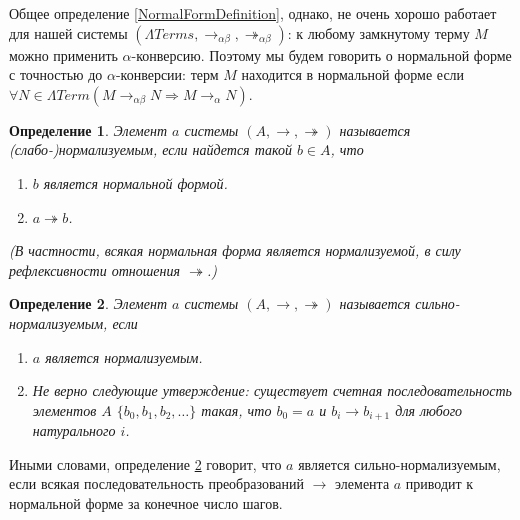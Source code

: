 \documentclass{article}[14pt]
\newtheorem{definition}{Определение}
\begin{document}
Общее определение \ref{NormalFormDefinition}, однако, не очень хорошо работает
для нашей системы $(\Lambda Terms, \rightarrow_{\alpha \beta}, \twoheadrightarrow_{\alpha \beta})$:
к любому замкнутому терму $M$ можно применить $\alpha$-конверсию. Поэтому мы будем говорить 
о нормальной форме с точностью до $\alpha$-конверсии: терм $M$ находится в нормальной форме
если $\forall N \in \Lambda Term (M \rightarrow_{\alpha \beta} N \Rightarrow M \rightarrow_\alpha N)$.

\begin{definition}
    \label{NormalizationDefinition}
    Элемент $a$ системы $(A, \rightarrow, \twoheadrightarrow)$ называется (слабо-)нормализуемым, если
    найдется такой $b \in A$, что 
    \begin{enumerate}
        \item $b$ является нормальной формой.
        \item $a \twoheadrightarrow b$.
    \end{enumerate}
    (В частности, всякая нормальная форма является нормализуемой, в силу рефлексивности отношения
    $\twoheadrightarrow$.)
\end{definition}

\begin{definition}
    \label{StrongNormalizationDefinition}
    Элемент $a$ системы $(A, \rightarrow, \twoheadrightarrow)$ называется сильно-нормализуемым,
    если
    \begin{enumerate}
        \item $a$ является нормализуемым.
        \item Не верно следующие утверждение: существует счетная последовательность
        элементов $A$ $\{ b_0, b_1, b_2, \dots \}$ такая, что $b_0 = a$ и 
        $b_i \rightarrow b_{i+1}$ для любого натурального $i$.
    \end{enumerate}
\end{definition}
Иными словами, определение \ref{StrongNormalizationDefinition} говорит, что $a$ является
сильно-нормализуемым, если всякая последовательность преобразований $\rightarrow$ элемента $a$ приводит
к нормальной форме за конечное число шагов.
\end{document}
